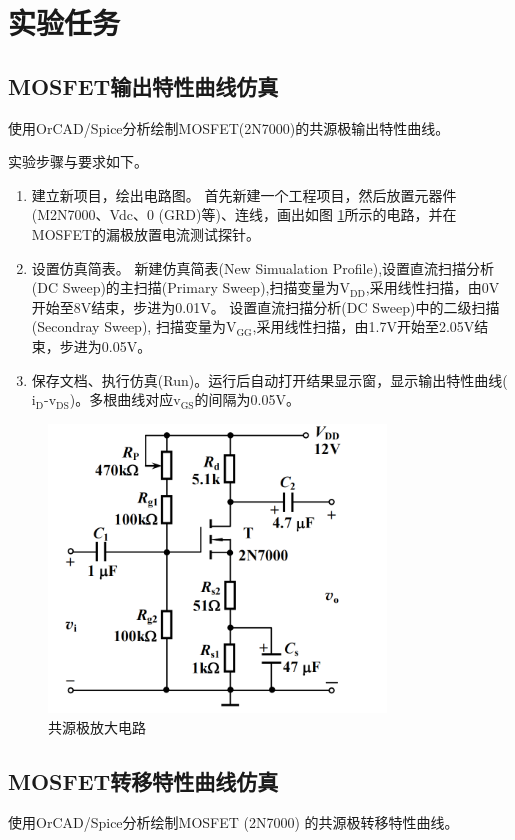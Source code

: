 \documentclass[a4paper]{article}
\theoremstyle{definition}
\theoremstyle{plain}
\theoremstyle{remark}
\newcommand{\reffig}[1]{图 \ref{#1}}
\begin{document}
\section{实验任务}
\subsection{MOSFET输出特性曲线仿真}
使用OrCAD/Spice分析绘制MOSFET(2N7000)的共源极输出特性曲线。

实验步骤与要求如下。
\begin{enumerate}
	\item 建立新项目，绘出电路图。
	      首先新建一个工程项目，然后放置元器件(M2N7000、Vdc、0 (GRD)等)、连线，画出如\reffig{共源极放大电路}所示的电路，并在MOSFET的漏极放置电流测试探针。
	\item 设置仿真简表。
	      新建仿真简表(New Simualation Profile),设置直流扫描分析(DC Sweep)的主扫描(Primary Sweep),扫描变量为$\mathrm{V_{DD}}$,采用线性扫描，由0V开始至8V结束，步进为0.01V。
	      设置直流扫描分析(DC Sweep)中的二级扫描(Secondray Sweep), 扫描变量为$\mathrm{V_{GG}}$,采用线性扫描，由1.7V开始至2.05V结束，步进为0.05V。
	\item 保存文档、执行仿真(Run)。运行后自动打开结果显示窗，显示输出特性曲线($\mathrm{i_D}$-$\mathrm{v_{DS}}$)。多根曲线对应$\mathrm{v_{GS}}$的间隔为0.05V。
\end{enumerate}
\begin{figure}[H]
	\centering
	\includegraphics[width=0.8\textwidth]{共源极放大电路}
	\caption{共源极放大电路}
	\label{共源极放大电路}
\end{figure}

\subsection{MOSFET转移特性曲线仿真}
使用OrCAD/Spice分析绘制MOSFET (2N7000) 的共源极转移特性曲线。
\end{document}
